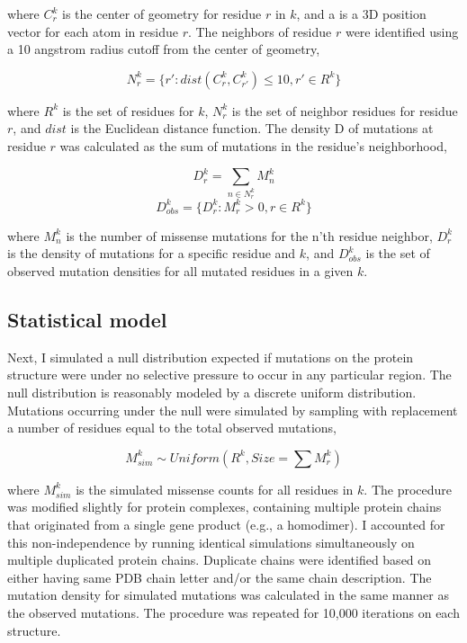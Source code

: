 where $C_r^k$ is the center of geometry for residue $r$ in $k$, and a is a 3D position vector for each atom in residue $r$. The neighbors of residue $r$ were identified using a 10 angstrom radius cutoff from the center of geometry,

\begin{equation}
N_r^k = \{r' : dist(C_r^k, C_{r'}^k) \leq 10, r' \in R^k \}
\end{equation}

where $R^k$ is the set of residues for $k$, $N_r^k$ is the set of neighbor residues for residue $r$, and $dist$ is the Euclidean distance function. The density D of mutations at residue $r$ was calculated as the sum of mutations in the residue's neighborhood,

\begin{equation}
D_r^k = \sum_{n \in N_r^k}{M^k_n}
\end{equation}
\begin{equation}
D^k_{obs} = \{D^k_r : M^k_r>0, r \in R^k\}
\end{equation}

where $M_n^k$ is the number of missense mutations for the n'th residue neighbor, $D_r^k$ is the density of mutations for a specific residue and $k$, and $D_{obs}^k$ is the set of observed mutation densities for all mutated residues in a given $k$.

\subsection{Statistical model}

Next, I simulated a null distribution expected if mutations on the protein structure were under no selective pressure to occur in any particular region.   The null distribution is reasonably modeled by a discrete uniform distribution. Mutations occurring under the null were simulated by sampling with replacement a number of residues equal to the total observed mutations,

\begin{equation}
M_{sim}^k \sim Uniform(R^k, Size=\sum{M_r^k})
\end{equation}

where $M_{sim}^k$ is the simulated missense counts for all residues in $k$.  The procedure was modified slightly for protein complexes, containing multiple protein chains that originated from a single gene product (e.g., a homodimer). I accounted for this non-independence by running identical simulations simultaneously on multiple duplicated protein chains.  Duplicate chains were identified based on either having same PDB chain letter and/or the same chain description. The mutation density for simulated mutations was calculated in the same manner as the observed mutations. The procedure was repeated for 10,000 iterations on each structure.

